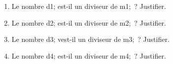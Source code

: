 \documentclass[exercice]{thedocument}%
\begin{document}
%
\begin{enumerate}
    \item Le nombre \<d1; est-il un diviseur de \<m1;~? Justifier.
    \item Le nombre \<d2; est-il un diviseur de \<m2;~? Justifier.
    \item Le nombre \<d3; vest-il un diviseur de \<m3;~? Justifier.
    \item Le nombre \<d4; est-il un diviseur de \<m4;~? Justifier.
\end{enumerate}
\end{document}
